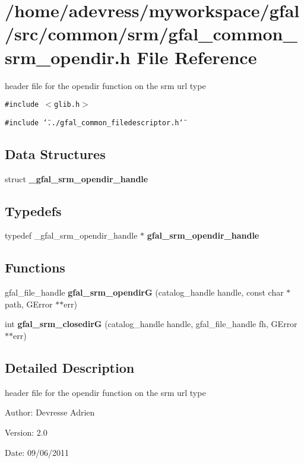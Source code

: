 \section{/home/adevress/myworkspace/gfal/src/common/srm/gfal\_\-common\_\-srm\_\-opendir.h File Reference}
\label{gfal__common__srm__opendir_8h}
header file for the opendir function on the srm url type 

{\tt \#include $<$glib.h$>$}\par
{\tt \#include \char`\"{}../gfal\_\-common\_\-filedescriptor.h\char`\"{}}\par
\subsection*{Data Structures}
\begin{CompactItemize}
\item 
struct \textbf{\_\-gfal\_\-srm\_\-opendir\_\-handle}
\end{CompactItemize}
\subsection*{Typedefs}
\begin{CompactItemize}
\item 
typedef \_\-gfal\_\-srm\_\-opendir\_\-handle $\ast$ \textbf{gfal\_\-srm\_\-opendir\_\-handle}\label{gfal__common__srm__opendir_8h_824f5b93bbf97b9fed247ce0d6603a2c}

\end{CompactItemize}
\subsection*{Functions}
\begin{CompactItemize}
\item 
gfal\_\-file\_\-handle \textbf{gfal\_\-srm\_\-opendir\-G} (catalog\_\-handle handle, const char $\ast$path, GError $\ast$$\ast$err)\label{gfal__common__srm__opendir_8h_ab26f6c3cdedfa804b2f8d2fd300e9df}

\item 
int \textbf{gfal\_\-srm\_\-closedir\-G} (catalog\_\-handle handle, gfal\_\-file\_\-handle fh, GError $\ast$$\ast$err)\label{gfal__common__srm__opendir_8h_a9f63a5ff1be26668963f98f2fba9733}

\end{CompactItemize}


\subsection{Detailed Description}
header file for the opendir function on the srm url type 

\begin{Desc}
\item[Author:]Devresse Adrien \end{Desc}
\begin{Desc}
\item[Version:]2.0 \end{Desc}
\begin{Desc}
\item[Date:]09/06/2011 \end{Desc}
